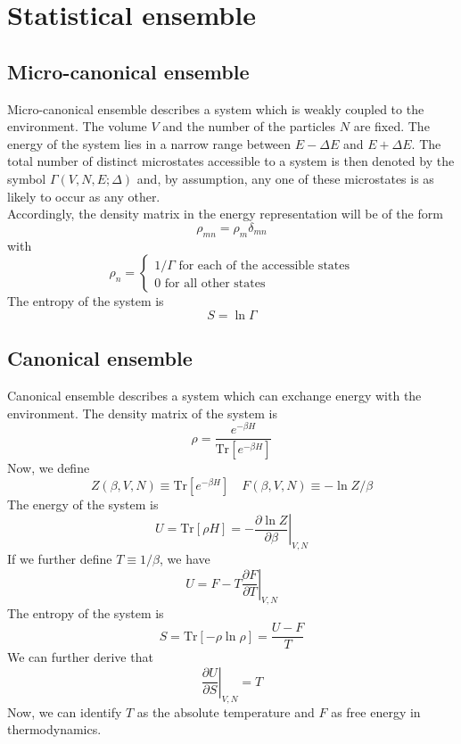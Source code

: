 \section{Statistical ensemble}
\subsection{Micro-canonical ensemble}
Micro-canonical ensemble describes a system which is weakly coupled to the environment. The volume $V$ and the number of the particles $N$ are fixed. The energy of the system lies in a narrow range between $E-\Delta E$ and $E + \Delta E$. The total number of distinct microstates accessible to a system is then denoted by the symbol $\Gamma(V,N,E;\Delta)$ and, by assumption, any one of these microstates is as likely to occur as any other. 
\\
Accordingly, the density matrix in the energy representation will be of the form
\[\rho_{mn} = \rho_m \delta_{mn}\]
with
\[\rho_n = \begin{cases} 1/\Gamma \mbox{ for each of the accessible states} \\ 0 \mbox{ for all other states} \end{cases}\]
The entropy of the system is
\[S = \ln \Gamma\]

\subsection{Canonical ensemble}
Canonical ensemble describes a system which can exchange energy with the environment. The density matrix of the system is
\[\rho = \frac{e^{-\beta H}}{\mathrm{Tr}[e^{-\beta H}]}\]
Now, we define
\[Z(\beta,V,N) \equiv \mathrm{Tr}[e^{-\beta H}] \quad F(\beta,V,N) \equiv -\ln Z/\beta\]
The energy of the system is
\[U = \mathrm{Tr}[\rho H] = -\left. \frac{\partial \ln Z}{\partial \beta} \right|_{V,N}\]
If we further define $T \equiv 1/\beta$, we have
\[U = F - T \left. \frac{\partial F}{\partial T} \right|_{V,N}\]
The entropy of the system is
\[S = \mathrm{Tr}[-\rho\ln\rho] = \frac{U-F}{T}\]
We can further derive that
\[\left. \frac{\partial U}{\partial S}\right|_{V,N} = T\]
Now, we can identify $T$ as the absolute temperature and $F$ as free energy in thermodynamics.

